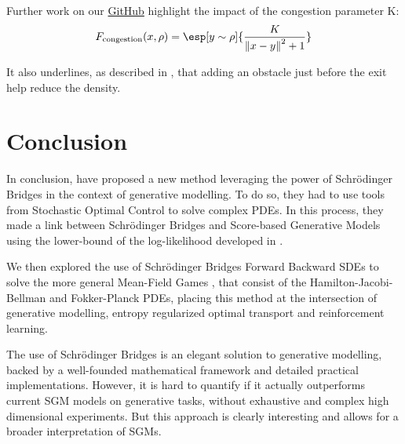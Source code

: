 \documentclass{article}
\begin{document}
Further work on our \href{https://github.com/gwatkinson/mva_sb_generative}{GitHub} highlight the impact of the congestion parameter K:
\[
F_{\rm congestion}(x, \rho) = \esp[y \sim \rho]{\frac{K}{\norme{x - y}^2 +1 }}
\]

It also underlines, as described in \cite{PhysRevLett.107.278001}, that adding an obstacle just before the exit help reduce the density.
\section*{Conclusion}

In conclusion, \cite{chen2023likelihood} have proposed a new method leveraging the power of Schrödinger Bridges in the context of generative modelling.
To do so, they had to use tools from Stochastic Optimal Control to solve complex PDEs.
In this process, they made a link between Schrödinger Bridges and Score-based Generative Models using the lower-bound of the log-likelihood developed in \cite{song2021maximum}.

We then explored the use of Schrödinger Bridges Forward Backward SDEs to solve the more general Mean-Field Games \cite{caluya2021wasserstein, liu2022deep}, that consist of the Hamilton-Jacobi-Bellman and Fokker-Planck PDEs, placing this method at the intersection of generative modelling, entropy regularized optimal transport and reinforcement learning.

The use of Schrödinger Bridges is an elegant solution to generative modelling, backed by a well-founded mathematical framework and detailed practical implementations.
However, it is hard to quantify if it actually outperforms current SGM models on generative tasks, without exhaustive and complex high dimensional experiments. But this approach is clearly interesting and allows for a broader interpretation of SGMs.





\clearpage






\newpage
\appendix
\end{document}
